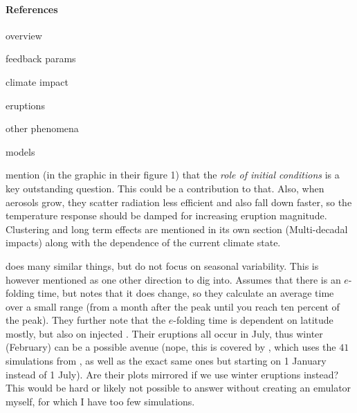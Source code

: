 \documentclass{ametsocV5}
\begin{document}
\paragraph*{References}

\begin{description}
  \item[overview] \citet{marshall2022}
  \item[feedback params] \citet{boer2007, gunther2022, gregory2020, hansen2005, knutti2017,
      marvel2016, merlis2014, ollila2016, pauling2021, richardson2019, salvi2022, wigley2005}
  \item[climate impact] \citet{gregory2016, jones2005, ottobliesner2016, santer2016,
      timmreck2009, timmreck2010, toohey2016b, yang2019, yokohata2005, zanchettin2019}
  \item[eruptions] \citet{arfeuille2014, douglass2006, lin2022, marshall2019, marshall2020,
      marshall2021, schmidt2018, soden2002, sukhodolov2018}
  \item[other phenomena] \citet{chen2022, lehner2016, marshall2018}
  \item[models] \citet{rypdal2012}
\end{description}

\citet{marshall2022} mention (in the graphic in their figure 1) that the \emph{role of
  initial conditions} is a key outstanding question. This could be a contribution to
that. Also, when aerosols grow, they scatter radiation less efficient and also fall
down faster, so the temperature response should be damped for increasing eruption
magnitude. Clustering and long term effects are mentioned in its own section
(Multi-decadal impacts) along with the dependence of the current climate state.

\citet{marshall2019} does many similar things, but do not focus on seasonal variability.
This is however mentioned as one other direction to dig into. Assumes that there is an
$e$-folding time, but notes that it does change, so they calculate an average time over
a small range (from a month after the peak until you reach ten percent of the peak).
They further note that the $e$-folding time is dependent on latitude mostly, but also on
injected . Their eruptions all occur in July, thus winter (February) can be a
possible avenue (nope, this is covered by \citet{marshall2020}, which uses the \(41\)
simulations from \citet{marshall2019}, as well as the exact same ones but starting on 1
January instead of 1 July). Are their plots mirrored if we use winter eruptions instead?
This would be hard or likely not possible to answer without creating an emulator myself,
for which I have too few simulations.
\end{document}
